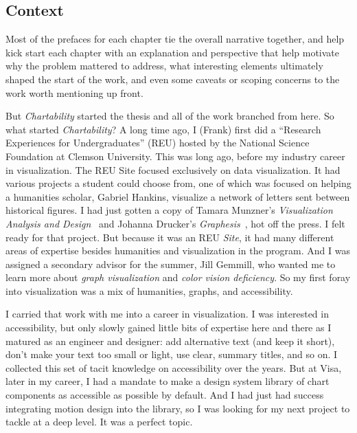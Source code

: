 \documentclass[12pt]{cmuthesis}
\begin{document}
\subsection{Context}

Most of the prefaces for each chapter tie the overall narrative together, and help kick start each chapter with an explanation and perspective that help motivate why the problem mattered to address, what interesting elements ultimately shaped the start of the work, and even some caveats or scoping concerns to the work worth mentioning up front.

But \textit{Chartability} started the thesis and all of the work branched from here. So what started \textit{Chartability}? A long time ago, I (Frank) first did a ``Research Experiences for Undergraduates'' (REU) hosted by the National Science Foundation at Clemson University. This was long ago, before my industry career in visualization. The REU Site focused exclusively on data visualization. It had various projects a student could choose from, one of which was focused on helping a humanities scholar, Gabriel Hankins, visualize a network of letters sent between historical figures. I had just gotten a copy of Tamara Munzner's \textit{Visualization Analysis and Design}~\cite{Munzner2014} and Johanna Drucker's \textit{Graphesis}~\cite{Drucker2014}, hot off the press. I felt ready for that project. But because it was an REU \textit{Site}, it had many different areas of expertise besides humanities and visualization in the program. And I was assigned a secondary advisor for the summer, Jill Gemmill, who wanted me to learn more about \textit{graph visualization} and \textit{color vision deficiency}. So my first foray into visualization was a mix of humanities, graphs, and accessibility.

I carried that work with me into a career in visualization. I was interested in accessibility, but only slowly gained little bits of expertise here and there as I matured as an engineer and designer: add alternative text (and keep it short), don't make your text too small or light, use clear, summary titles, and so on. I collected this set of tacit knowledge on accessibility over the years. But at Visa, later in my career, I had a mandate to make a design system library of chart components as accessible as possible by default. And I had just had success integrating motion design into the library, so I was looking for my next project to tackle at a deep level. It was a perfect topic.
\end{document}
